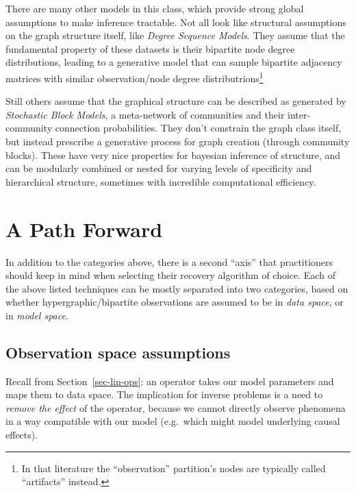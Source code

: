 \documentclass[%
	12pt,
		oneside,
		letterpaper
]{book}
\begin{document}
There are many other models in this class, which provide strong global
assumptions to make inference tractable. Not all look like structural
assumptions on the graph structure itself, like \emph{Degree Sequence
Models}.
\autocite{backbonebipartiteprojections_Neal2014,Comparingalternativesfixed_Neal2021}
They assume that the fundamental property of these datasets is their
bipartite node degree distributions, leading to a generative model that
can sample bipartite adjacency matrices with similar observation/node
degree distributrions\footnote{In that literature the ``observation''
  partition's nodes are typically called ``artifacts'' instead.}

Still others assume that the graphical structure can be described as
generated by \emph{Stochastic Block Models}, a meta-network of
communities and their inter-community connection probabilities. They
don't constrain the graph class itself, but instead prescribe a
generative process for graph creation (through community blocks). These
have very nice properties for bayesian inference of structure, and can
be modularly combined or nested for varying levels of specificity and
hierarchical structure, sometimes with incredible computational
efficiency.
\autocite{ReconstructingNetworksUnknown_Peixoto2018,NetworkReconstructionCommunity_Peixoto2019}

\section{A Path Forward}\label{a-path-forward}

In addition to the categories above, there is a second ``axis'' that
practitioners should keep in mind when selecting their recovery
algorithm of choice. Each of the above listed techniques can be mostly
separated into two categories, based on whether hypergraphic/bipartite
observations are assumed to be in \emph{data space}, or in \emph{model
space}.

\subsection{Observation space
assumptions}\label{observation-space-assumptions}

Recall from Section~\ref{sec-lin-ops}: an operator takes our model
parameters and maps them to data space. The implication for inverse
problems is a need to \emph{remove the effect} of the operator, because
we cannot directly observe phenomena in a way compatible with our model
(e.g.~which might model underlying causal effects).
\end{document}
